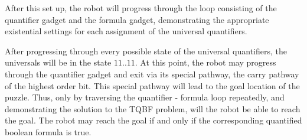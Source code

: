 After this set up, the robot will progress through the loop consisting of the quantifier gadget and the
formula gadget, demonstrating the appropriate existential settings for each assignment of the universal
quantifiers.

After progressing through every possible state of the universal quantifiers, the universals will be in the
state $11 .. 11$. At this point, the robot may progress through the quantifier gadget and exit via its special
pathway,
the carry pathway of the highest order bit. This special pathway will lead to the goal location of the puzzle.
Thus, only by traversing the quantifier - formula loop repeatedly, and demonstrating the solution to the TQBF
problem,
will the robot be able to reach the goal. The robot may reach the goal if and only if the corresponding quantified
boolean formula is true.
